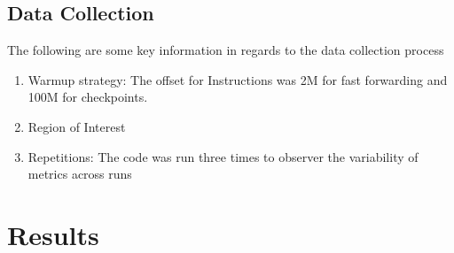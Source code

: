 \documentclass[11pt, a4paper]{article}
\begin{document}
\subsection{Data Collection}

The following are some key information in regards to the data collection process 
\begin{enumerate}
    \item Warmup strategy: The offset for Instructions was 2M for fast forwarding and 100M for checkpoints.
    \item Region of Interest
    \item Repetitions: The code was run three times to observer the variability of metrics across runs
\end{enumerate}

\section{Results}
\end{document}
